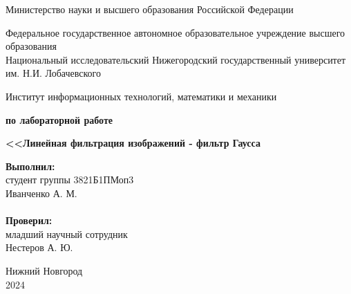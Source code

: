\documentclass{article}
\begin{document}
\begin{titlepage}

\begin{center}
Министерство науки и высшего образования Российской Федерации
\end{center}

\begin{center}
Федеральное государственное автономное образовательное учреждение высшего образования \\
Национальный исследовательский Нижегородский государственный университет им. Н.И. Лобачевского
\end{center}

\begin{center}
Институт информационных технологий, математики и механики
\end{center}

\vspace{4em}

\begin{center}
\textbf{ по лабораторной работе} \\
\end{center}
\begin{center}
\textbf{\Large<<Линейная фильтрация изображений - фильтр Гаусса} \\
\end{center}

\vspace{4em}

\newbox{\lbox}
\newlength{\maxl}
\setlength{\maxl}{\wd\lbox}
\hfill\parbox{7cm}{
\hspace*{5cm}\hspace*{-5cm}\textbf{Выполнил:} \\ студент группы 3821Б1ПМоп3\\Иванченко А. М.\\
\\
\hspace*{5cm}\hspace*{-5cm}\textbf{Проверил:}\\ младший научный сотрудник\\Нестеров А. Ю.\\
}
\vspace{\fill}

\begin{center} Нижний Новгород \\ 2024 \end{center}

\end{titlepage}
\setcounter{page}{2}
\end{document}
